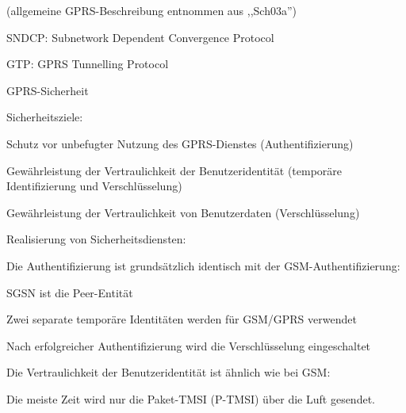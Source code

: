 \documentclass[a4paper]{article}
\begin{document}
\begin{multicols}{3}
      (allgemeine GPRS-Beschreibung entnommen aus ,,Sch03a'')



      \begin{itemize*}
            \item SNDCP: Subnetwork Dependent Convergence Protocol
            \item GTP: GPRS Tunnelling Protocol
      \end{itemize*}

      GPRS-Sicherheit
      \begin{itemize*}
            \item Sicherheitsziele:
            \begin{itemize*}
                  \item Schutz vor unbefugter Nutzung des GPRS-Dienstes (Authentifizierung)
                  \item Gewährleistung der Vertraulichkeit der Benutzeridentität (temporäre Identifizierung und Verschlüsselung)
                  \item Gewährleistung der Vertraulichkeit von Benutzerdaten (Verschlüsselung)
            \end{itemize*}
            \item Realisierung von Sicherheitsdiensten:
            \begin{itemize*}
                  \item Die Authentifizierung ist grundsätzlich identisch mit der GSM-Authentifizierung:
                  \begin{itemize*}
                        \item SGSN ist die Peer-Entität
                        \item Zwei separate temporäre Identitäten werden für GSM/GPRS verwendet
                        \item Nach erfolgreicher Authentifizierung wird die Verschlüsselung eingeschaltet
                  \end{itemize*}
                  \item Die Vertraulichkeit der Benutzeridentität ist ähnlich wie bei GSM:
                  \begin{itemize*}
                        \item Die meiste Zeit wird nur die Paket-TMSI (P-TMSI) über die Luft gesendet.

\end{itemize*}
\end{itemize*}
\end{itemize*}
\end{multicols}
\end{document}
